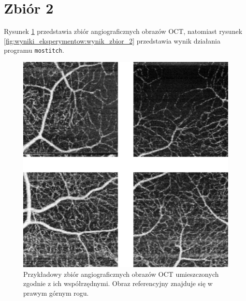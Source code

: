 \section{Zbiór 2}
\label{sec:zbior_2}

Rysunek \ref{fig:wyniki_eksperymentow:zbior_2} przedstawia zbiór angiograficznych obrazów OCT, natomiast rysunek \ref{fig:wyniki_eksperymentow:wynik_zbior_2} przedstawia wynik działania programu \texttt{mostitch}.

\begin{figure}[htb]
  \centering
  \includegraphics[width=\textwidth]{gfx/zbior_2}
  \caption{Przykładowy zbiór angiograficznych obrazów OCT umieszczonych zgodnie z ich współrzędnymi. Obraz referencyjny znajduje się w prawym górnym rogu.}
  \label{fig:wyniki_eksperymentow:zbior_2}
\end{figure}

